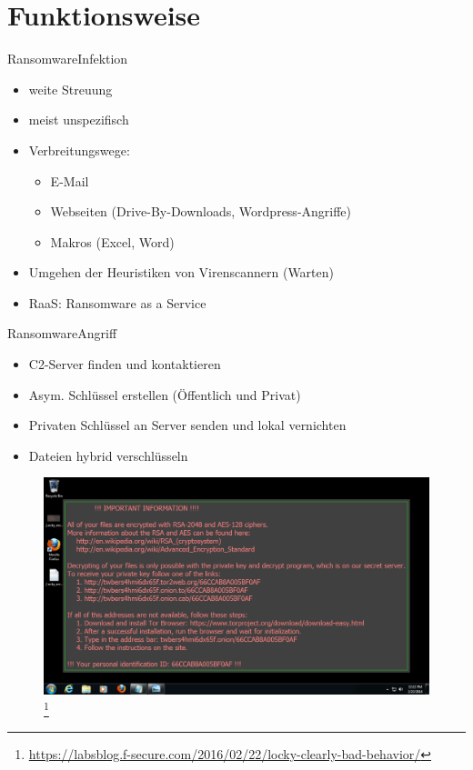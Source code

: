 \documentclass[10pt]{beamer}
\begin{document}
\section{Funktionsweise}
\begin{frame}{Ransomware}{Infektion}
		\begin{itemize}
			\item weite Streuung
			\item meist unspezifisch
			\item Verbreitungswege:
				\begin{itemize}
					\item E-Mail
					\item Webseiten (Drive-By-Downloads, Wordpress-Angriffe)
					\item Makros (Excel, Word)
				\end{itemize}
			\item Umgehen der Heuristiken von Virenscannern (Warten)
			\item RaaS: Ransomware as a Service
		\end{itemize}
\end{frame}
\begin{frame}{Ransomware}{Angriff}
		\begin{itemize}
			\item C2-Server finden und kontaktieren
			\item Asym. Schlüssel erstellen (Öffentlich und Privat)
			\item Privaten Schlüssel an Server senden und lokal vernichten
			\item Dateien hybrid verschlüsseln 
		\end{itemize}
\end{frame}

\begin{frame}[plain]
	\begin{figure}[p]
		\centering
		\includegraphics[scale=0.30]{locky-recover-instructions.png}
		\let\thefootnote\relax\footnote{\url{https://labsblog.f-secure.com/2016/02/22/locky-clearly-bad-behavior/}}
	\end{figure}
\end{frame}
\end{document}
